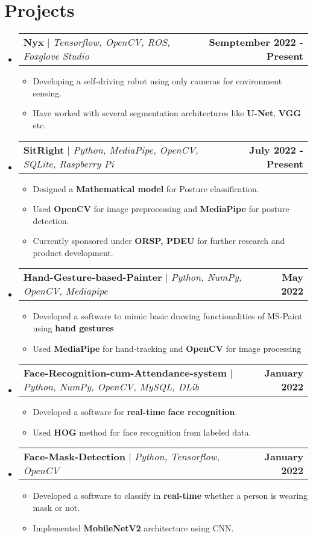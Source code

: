 \documentclass[letterpaper,11pt]{article}
\makeatletter
\newcommand{\resumeItem}[1]{
  \item\small{
    {#1 \vspace{-2pt}}
  }
}
\newcommand{\resumeProjectHeading}[2]{
    \item
    \begin{tabular*}{1.001\textwidth}{l@{\extracolsep{\fill}}r}
      \small#1 & \textbf{\small #2}\\
    \end{tabular*}\vspace{-7pt}
}
\newcommand{\resumeSubHeadingListStart}{\begin{itemize}[leftmargin=0.0in, label={}]}
\newcommand{\resumeSubHeadingListEnd}{\end{itemize}}
\newcommand{\resumeItemListStart}{\begin{itemize}}
\newcommand{\resumeItemListEnd}{\end{itemize}\vspace{-5pt}}
\makeatother
\begin{document}
\section{Projects}
    \vspace{-2pt}
    \resumeSubHeadingListStart
        \resumeProjectHeading
          {\textbf{Nyx} $|$ \emph{Tensorflow, OpenCV, ROS, Foxglove Studio}}{Semptember 2022 - Present}
          \resumeItemListStart
            \resumeItem{Developing a self-driving robot using only cameras for environment sensing.}
            \resumeItem{Have worked with several segmentation architectures like \textbf{U-Net}, \textbf{VGG} etc.}
          \resumeItemListEnd
          \vspace{-13pt}
      \resumeProjectHeading
          {\textbf{SitRight} $|$ \emph{Python, MediaPipe, OpenCV, SQLite, Raspberry Pi}}{July 2022 - Present}
          \resumeItemListStart
            \resumeItem{Designed a \textbf{Mathematical model} for Posture classification.}
            \resumeItem{Used \textbf{OpenCV} for image preprocessing and \textbf{MediaPipe} for posture detection.}
            \resumeItem{Currently sponsored under \textbf{ORSP, PDEU} for further research and product development.}
          \resumeItemListEnd
          \vspace{-13pt}
          \resumeProjectHeading
          {\textbf{Hand-Gesture-based-Painter} $|$ \emph{Python, NumPy, OpenCV, Mediapipe}}{May 2022}
          \resumeItemListStart
            \resumeItem{Developed a software to mimic basic drawing functionalities of MS-Paint using \textbf{hand gestures}}
            \resumeItem{Used \textbf{MediaPipe} for hand-tracking and \textbf{OpenCV} for image processing}
          \resumeItemListEnd 
          \vspace{-13pt}
        \resumeProjectHeading
          {\textbf{Face-Recognition-cum-Attendance-system} $|$ \emph{Python, NumPy, OpenCV, MySQL, DLib}}{January 2022}
          \resumeItemListStart
            \resumeItem{Developed a software for \textbf{real-time} \textbf{face recognition}.}
            \resumeItem{Used \textbf{HOG} method for face recognition from labeled data.}
          \resumeItemListEnd 
          \vspace{-13pt}
      \resumeProjectHeading
          {\textbf{Face-Mask-Detection} $|$ \emph{Python, Tensorflow, OpenCV}}{January 2022}
          \resumeItemListStart
            \resumeItem{Developed a software to classify in \textbf{real-time} whether a person is wearing mask or not.}
            \resumeItem{Implemented \textbf{MobileNetV2} architecture using CNN.}
          \resumeItemListEnd 
          \vspace{-13pt}
    \resumeSubHeadingListEnd
\vspace{0 pt}
\end{document}
